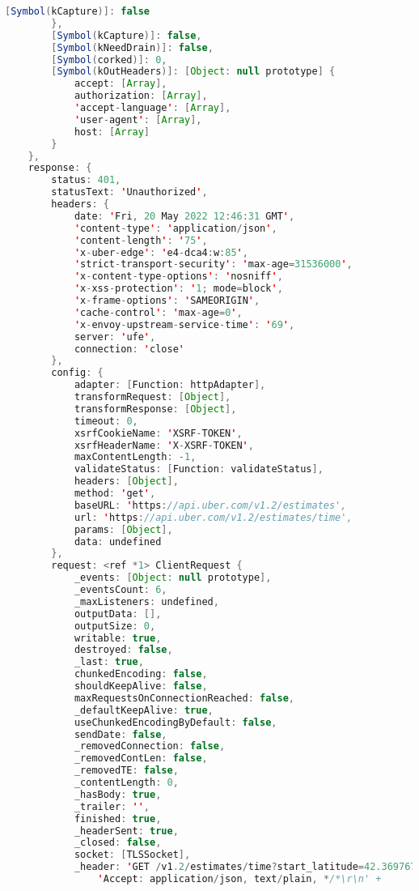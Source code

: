 \begin{lstlisting}[language=Java, caption=Pesan Error Perkakas \textit{Uber CLI}]
            [Symbol(kCapture)]: false
        },
        [Symbol(kCapture)]: false,
        [Symbol(kNeedDrain)]: false,
        [Symbol(corked)]: 0,
        [Symbol(kOutHeaders)]: [Object: null prototype] {
            accept: [Array],
            authorization: [Array],
            'accept-language': [Array],
            'user-agent': [Array],
            host: [Array]
        }
    },
    response: {
        status: 401,
        statusText: 'Unauthorized',
        headers: {
            date: 'Fri, 20 May 2022 12:46:31 GMT',
            'content-type': 'application/json',
            'content-length': '75',
            'x-uber-edge': 'e4-dca4:w:85',
            'strict-transport-security': 'max-age=31536000',
            'x-content-type-options': 'nosniff',
            'x-xss-protection': '1; mode=block',
            'x-frame-options': 'SAMEORIGIN',
            'cache-control': 'max-age=0',
            'x-envoy-upstream-service-time': '69',
            server: 'ufe',
            connection: 'close'
        },
        config: {
            adapter: [Function: httpAdapter],
            transformRequest: [Object],
            transformResponse: [Object],
            timeout: 0,
            xsrfCookieName: 'XSRF-TOKEN',
            xsrfHeaderName: 'X-XSRF-TOKEN',
            maxContentLength: -1,
            validateStatus: [Function: validateStatus],
            headers: [Object],
            method: 'get',
            baseURL: 'https://api.uber.com/v1.2/estimates',
            url: 'https://api.uber.com/v1.2/estimates/time',
            params: [Object],
            data: undefined
        },
        request: <ref *1> ClientRequest {
            _events: [Object: null prototype],
            _eventsCount: 6,
            _maxListeners: undefined,
            outputData: [],
            outputSize: 0,
            writable: true,
            destroyed: false,
            _last: true,
            chunkedEncoding: false,
            shouldKeepAlive: false,
            maxRequestsOnConnectionReached: false,
            _defaultKeepAlive: true,
            useChunkedEncodingByDefault: false,
            sendDate: false,
            _removedConnection: false,
            _removedContLen: false,
            _removedTE: false,
            _contentLength: 0,
            _hasBody: true,
            _trailer: '',
            finished: true,
            _headerSent: true,
            _closed: false,
            socket: [TLSSocket],
            _header: 'GET /v1.2/estimates/time?start_latitude=42.3697672&start_longitude=-71.077356 HTTP/1.1\r\n' +
                'Accept: application/json, text/plain, */*\r\n' +

\end{lstlisting}
